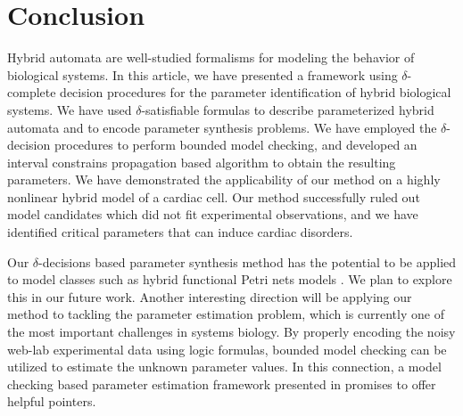 \section{Conclusion}
Hybrid automata are well-studied formalisms for modeling the behavior of biological systems. In this article, we have presented a framework using $\delta$-complete decision procedures for the parameter identification of hybrid biological systems. We have used $\delta$-satisfiable formulas to describe parameterized hybrid automata and to encode parameter synthesis problems. We have employed the $\delta$-decision procedures to perform bounded model checking, and developed an interval constrains propagation based algorithm to obtain the resulting parameters.
We have demonstrated the applicability of our method on a highly nonlinear hybrid model of a cardiac cell. Our method successfully ruled out model candidates which did not fit experimental observations, and we have identified critical parameters that can induce cardiac disorders.

Our $\delta$-decisions based parameter synthesis method has the potential to be applied to model classes such as hybrid functional Petri nets models \citep{hfpn}. We plan to explore this in our future work. Another interesting direction will be applying our method to tackling the parameter estimation problem, which is currently one of the most important challenges in systems biology. By properly encoding the noisy web-lab experimental data using logic formulas, bounded model checking can be utilized to estimate the unknown parameter values. In this connection, a model checking based parameter estimation framework presented in \cite{liu13} promises to offer helpful pointers.









